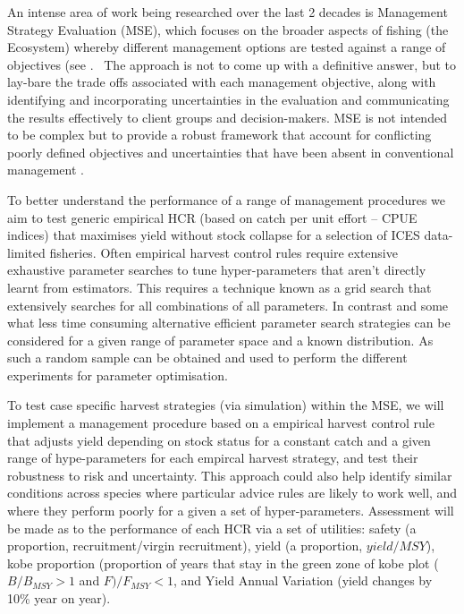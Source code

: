 \documentclass[preprint,12pt]{elsarticle}
\begin{document}
An intense area of work being researched over the last 2 decades is Management Strategy Evaluation (MSE), which focuses on the broader aspects of fishing (the Ecosystem) whereby different management options are tested against a range of objectives (see \cite{Kell et al., 2007}.  The approach is not to come up with a definitive answer, but to lay-bare the trade offs associated with each management objective, along with identifying and incorporating uncertainties in the evaluation and communicating the results effectively to client groups and decision-makers. MSE is not intended to be complex but to provide a robust framework that account for conflicting poorly defined objectives and uncertainties that have been absent in conventional management \cite{Kell et al., 2007}.  

To better understand the performance of a range of management procedures we aim to test generic empirical HCR (based on catch per unit effort – CPUE indices) that maximises yield without stock collapse for  a selection of ICES data-limited fisheries. Often empirical harvest control rules require extensive exhaustive parameter searches to tune hyper-parameters that aren’t directly learnt from estimators.  This requires a technique known as a grid search that extensively searches for all combinations of all parameters. In contrast and some what less time consuming alternative efficient parameter search strategies can be considered for a given range of parameter space and a known distribution.  As such a random sample can be obtained and used to perform the different experiments for parameter optimisation. 

To test case specific harvest strategies (via simulation) within the MSE, we will implement a management procedure based on a empirical harvest control rule that adjusts yield depending on stock status for a constant catch and a given range of hype-parameters for each empircal harvest strategy, and test their robustness to risk and uncertainty.  This approach could also help identify similar conditions across species where particular advice rules are likely to work well, and where they perform poorly for a given a set of hyper-parameters. Assessment will be made as to the performance of each HCR via a set of utilities: safety (a proportion, recruitment/virgin recruitment), yield (a proportion, $yield/MSY$), kobe proportion (proportion of years that stay in the green zone of kobe plot ($B/B_{MSY} >1$ and $F)/F_{MSY} < 1$, and Yield Annual Variation (yield changes by 10\% year on year). 
\end{document}
